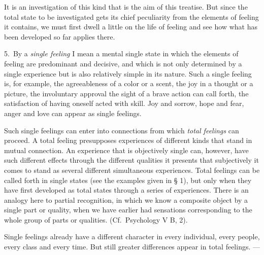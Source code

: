 \documentclass[12pt]{book}
\newcommand{\opage}[1]{\marginnote{\footnotesize\textit{[#1]}}}
\begin{document}
It is an investigation of this kind that is the aim of this treatise. But since
the total state to be investigated \opage{25}gets its chief peculiarity from the
elements of feeling it contains, we must first dwell a little on the life of
feeling and see how what has been developed so far applies there.

5.~By a \emph{single feeling} I mean a mental single state in which the
elements of feeling are predominant and decisive, and which is not only
determined by a single experience but is also relatively simple in its nature.
Such a single feeling is, for example, the agreeableness of a color or a scent,
the joy in a thought or a picture, the involuntary approval the sight of a brave
action can call forth, the satisfaction of having oneself acted with skill. Joy
and sorrow, hope and fear, anger and love can appear as single feelings.

Such single feelings can enter into connections from which \emph{total
feelings} can proceed. A total feeling presupposes experiences of different
kinds that stand in mutual connection. An experience that is objectively single
can, however, have such different effects through the different qualities it
presents that subjectively it comes to stand as several different simultaneous
experiences. Total feelings can be called forth in single states (see the
examples given in § 1), but only when they have first developed as total states
through a series of experiences. There is an analogy here to partial
recognition, in which we know a composite object by a single part or quality,
when we have earlier had sensations corresponding to the whole group of parts or
qualities. (Cf.\ Psychology V B, 2).

Single feelings already have a different character in every individual, every
people, every class and every time. But still greater differences appear in total
feelings. ---
\end{document}
